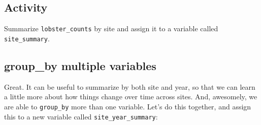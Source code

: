 \documentclass[]{book}
\newenvironment{Shaded}{\begin{snugshade}}{\end{snugshade}}
\newcommand{\DataTypeTok}[1]{\textcolor[rgb]{0.13,0.29,0.53}{#1}}
\newcommand{\KeywordTok}[1]{\textcolor[rgb]{0.13,0.29,0.53}{\textbf{#1}}}
\newcommand{\NormalTok}[1]{#1}
\newcommand{\OperatorTok}[1]{\textcolor[rgb]{0.81,0.36,0.00}{\textbf{#1}}}
\newcommand{\StringTok}[1]{\textcolor[rgb]{0.31,0.60,0.02}{#1}}
\begin{document}
\begin{Shaded}
\end{Shaded}

\hypertarget{activity-5}{%
\subsection{Activity}\label{activity-5}}

Summarize \texttt{lobster\_counts} by site and assign it to a variable called \texttt{site\_summary}.

\begin{Shaded}
\end{Shaded}

\hypertarget{group_by-multiple-variables}{%
\subsection{group\_by multiple variables}\label{group_by-multiple-variables}}

Great. It can be useful to summarize by both site and year, so that we can learn a little more about how things change over time across sites. And, awesomely, we are able to \texttt{group\_by} more than one variable. Let's do this together, and assign this to a new variable called \texttt{site\_year\_summary}:

\begin{Shaded}
\end{Shaded}
\end{document}
